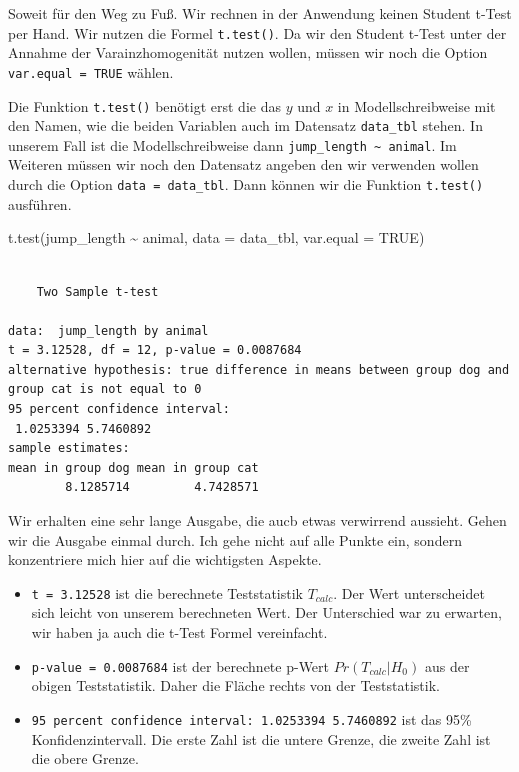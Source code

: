 \documentclass[
  letterpaper,
]{scrbook}
\newenvironment{Shaded}{\begin{snugshade}}{\end{snugshade}}
\newcommand{\AttributeTok}[1]{\textcolor[rgb]{0.40,0.45,0.13}{#1}}
\newcommand{\ConstantTok}[1]{\textcolor[rgb]{0.56,0.35,0.01}{#1}}
\newcommand{\FunctionTok}[1]{\textcolor[rgb]{0.28,0.35,0.67}{#1}}
\newcommand{\NormalTok}[1]{\textcolor[rgb]{0.00,0.23,0.31}{#1}}
\newcommand{\SpecialCharTok}[1]{\textcolor[rgb]{0.37,0.37,0.37}{#1}}
\providecommand{\tightlist}{%
  \setlength{\itemsep}{0pt}\setlength{\parskip}{0pt}}\usepackage{longtable,booktabs,array}
\begin{document}
Soweit für den Weg zu Fuß. Wir rechnen in der Anwendung keinen Student
t-Test per Hand. Wir nutzen die Formel \texttt{t.test()}. Da wir den
Student t-Test unter der Annahme der Varainzhomogenität nutzen wollen,
müssen wir noch die Option \texttt{var.equal\ =\ TRUE} wählen.

Die Funktion \texttt{t.test()} benötigt erst die das \(y\) und \(x\) in
Modellschreibweise mit den Namen, wie die beiden Variablen auch im
Datensatz \texttt{data\_tbl} stehen. In unserem Fall ist die
Modellschreibweise dann
\texttt{jump\_length\ \textasciitilde{}\ animal}. Im Weiteren müssen wir
noch den Datensatz angeben den wir verwenden wollen durch die Option
\texttt{data\ =\ data\_tbl}. Dann können wir die Funktion
\texttt{t.test()} ausführen.

\begin{Shaded}
\begin{Highlighting}[]
\FunctionTok{t.test}\NormalTok{(jump\_length }\SpecialCharTok{\textasciitilde{}}\NormalTok{ animal, }
       \AttributeTok{data =}\NormalTok{ data\_tbl, }\AttributeTok{var.equal =} \ConstantTok{TRUE}\NormalTok{)}
\end{Highlighting}
\end{Shaded}

\begin{verbatim}

    Two Sample t-test

data:  jump_length by animal
t = 3.12528, df = 12, p-value = 0.0087684
alternative hypothesis: true difference in means between group dog and group cat is not equal to 0
95 percent confidence interval:
 1.0253394 5.7460892
sample estimates:
mean in group dog mean in group cat 
        8.1285714         4.7428571 
\end{verbatim}

Wir erhalten eine sehr lange Ausgabe, die aucb etwas verwirrend
aussieht. Gehen wir die Ausgabe einmal durch. Ich gehe nicht auf alle
Punkte ein, sondern konzentriere mich hier auf die wichtigsten Aspekte.

\begin{itemize}
\tightlist
\item
  \texttt{t\ =\ 3.12528} ist die berechnete Teststatistik \(T_{calc}\).
  Der Wert unterscheidet sich leicht von unserem berechneten Wert. Der
  Unterschied war zu erwarten, wir haben ja auch die t-Test Formel
  vereinfacht.
\item
  \texttt{p-value\ =\ 0.0087684} ist der berechnete p-Wert
  \(Pr(T_{calc}|H_0)\) aus der obigen Teststatistik. Daher die Fläche
  rechts von der Teststatistik.
\item
  \texttt{95\ percent\ confidence\ interval:\ 1.0253394\ 5.7460892} ist
  das 95\% Konfidenzintervall. Die erste Zahl ist die untere Grenze, die
  zweite Zahl ist die obere Grenze.
\end{itemize}
\end{document}
